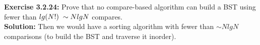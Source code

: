 \documentclass[11pt,fleqn]{article}
\begin{document}
\textbf{Exercise 3.2.24:} Prove that no compare-based algorithm can build a BST using fewer than
$lg(N !) \thickspace \sim N lg N$ compares.\\

\textbf{Solution:} Then we would have a sorting algorithm with fewer than $\sim NlgN$ comparisons (to build
the BST and traverse it inorder).
\end{document}
